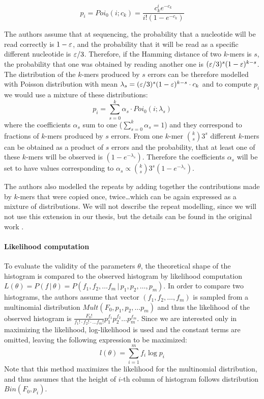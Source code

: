 $$ p_i = Poi_0(i; c_k) = \frac{c_k^i e^{-c_k}}{i!(1 - e^{-c_k})} $$

The authors assume that at sequencing, the probability that a nucleotide will be read
correctly is $1-\varepsilon$, and the probability that it will be read as a specific different
nucleotide is $\varepsilon/3$. Therefore, if the Hamming distance of two $k$-mers is $s$, the
probability that one was obtained by reading another one is $(\varepsilon/3)^s(1-\varepsilon)^{k-s}$.
The distribution of the $k$-mers produced by $s$ errors can be
therefore modelled with Poisson distribution with mean 
$\lambda_s = (\varepsilon/3)^s(1-\varepsilon)^{k-s} \cdot c_k$ and to compute $p_i$ we would use
a mixture of these distributions:
$$ p_i = \sum_{s=0}^k \alpha_s \cdot Poi_0(i; \lambda_s) $$
where the coefficients $\alpha_s$ sum to one ($\sum_{s=0}^k \alpha_s = 1$) and they correspond
to fractions of $k$-mers produced by $s$ errors. From one $k$-mer ${k \choose s} 3^s$ 
different $k$-mers can be obtained as a product of $s$ errors and the probability, 
that at least one of these $k$-mers will be observed is $(1 - e^{-\lambda_s})$. 
Therefore the coefficients $\alpha_s$ will be set to have values corresponding to 
$\alpha_s \propto {k \choose s} 3^s(1 - e^{-\lambda_s})$.

The authors also modelled the repeats by adding together the contributions made by
$k$-mers that were copied once, twice\dots which can be again expressed as a mixture of
distributions. We will not describe the repeat modelling, since we will not use this extension
in our thesis, but the details can be found in the original work \cite{Hozza2015, Hozza2016}.  


\paragraph{Likelihood computation}
To evaluate the validity of the parameters $\theta$, the theoretical shape of the histogram is
compared to the observed histogram by likelihood computation
$L(\theta) = P(f\,|\,\theta) = P(f_1, f_2, \dots f_m\,|\,p_1, p_2, \dots, p_m)$. In order to
compare two histograms, the authors assume that vector $(f_1, f_2, \dots, f_m)$ is sampled
from a multinomial distribution $Mult(F_0, p_1, p_2, \dots p_m)$ and thus the
likelihood of the observed histogram is 
$\frac{F_0!}{f_1! \cdot f_2! \cdot \dots f_m!} p_1^{f_1} p_2^{f_2} \dots p_m ^{f_m}$.
Since we are interested only in maximizing the likelihood, log-likelihood is used and
the constant terms are omitted, leaving the following expression to be maximized:
\begin{equation} \label{eq:covest-likelihood}
l(\theta) = \sum_{i=1}^m f_i \log p_i
\end{equation}
Note that this method maximizes the likelihood for the multinomial distribution,
and thus assumes that the height of $i$-th column of histogram follows distribution $Bin(F_0, p_i)$.

